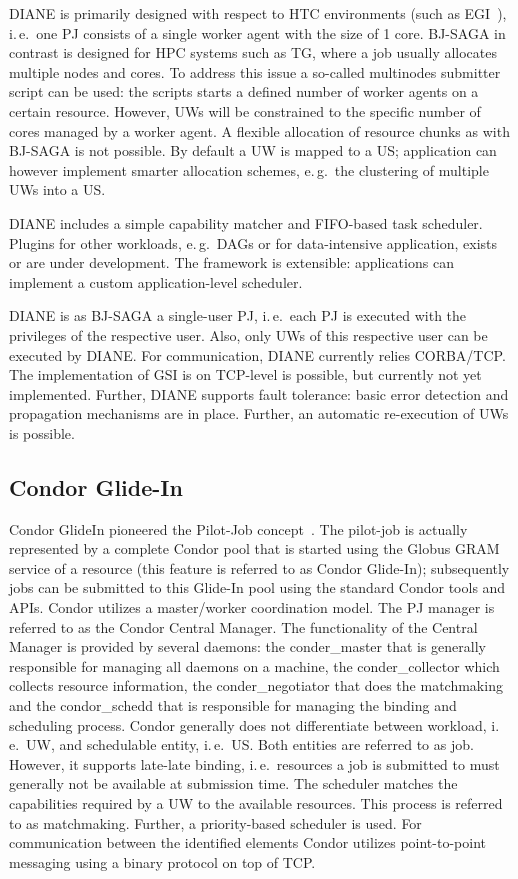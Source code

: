 \documentclass[conference,final]{IEEEtran}
\newcommand{\upp}{\vspace*{-0.5em}}
\begin{document}
DIANE is primarily designed with respect to HTC environments (such as
EGI~\cite{egi}), i.\,e.\ one PJ consists of a single worker agent with the size
of 1 core. BJ-SAGA in contrast is designed for HPC systems such as TG, where a
job usually allocates multiple nodes and cores. To address this issue a
so-called multinodes submitter script can be used: the scripts starts a defined
number of worker agents on a certain resource. However, UWs will be constrained
to the specific number of cores managed by a worker agent. A flexible allocation
of resource chunks as with BJ-SAGA is not possible. By default a UW is mapped to
a US; application can however implement smarter allocation schemes, e.\,g.\ the
clustering of multiple UWs into a US.

DIANE includes a simple capability matcher and FIFO-based task scheduler.
Plugins for other workloads, e.\,g.\ DAGs or for data-intensive
application, exists or are under development. The framework is extensible:
applications can implement a custom application-level scheduler.


DIANE is as BJ-SAGA a single-user PJ, i.\,e.\ each PJ is executed with the
privileges of the respective user. Also, only UWs of this respective user can be
executed by DIANE. For communication, DIANE currently relies CORBA/TCP. The 
implementation of GSI is on TCP-level is possible, but currently not yet 
implemented. Further, DIANE supports fault tolerance: basic error detection and propagation mechanisms are in place. Further, an automatic re-execution of UWs is possible.


\subsection{Condor Glide-In\upp\upp}

Condor GlideIn pioneered the Pilot-Job concept~\cite{condor-g}. The pilot-job is
actually represented by a complete Condor pool that is started using the Globus
GRAM service of a resource (this feature is referred to as Condor Glide-In);
subsequently jobs can be submitted to this Glide-In pool using the standard
Condor tools and APIs. Condor utilizes a master/worker coordination model. The
PJ manager is referred to as the Condor Central Manager. The functionality of
the Central Manager is provided by several daemons: the conder\_master that is
generally responsible for managing all daemons on a machine, the
conder\_collector which collects resource information, the conder\_negotiator
that does the matchmaking and the condor\_schedd that is responsible for
managing the binding and scheduling process. Condor generally does not
differentiate between workload, i.\,e.\ UW, and schedulable entity, i.\,e.\ US.
Both entities are referred to as job. However, it supports late-late binding,
i.\,e.\ resources a job is submitted to must generally not be available at
submission time. The scheduler matches the capabilities required by a UW to the
available resources. This process is referred to as matchmaking. Further, a
priority-based scheduler is used. For communication between the identified
elements Condor utilizes point-to-point messaging using a binary protocol on top
of TCP.
\end{document}
